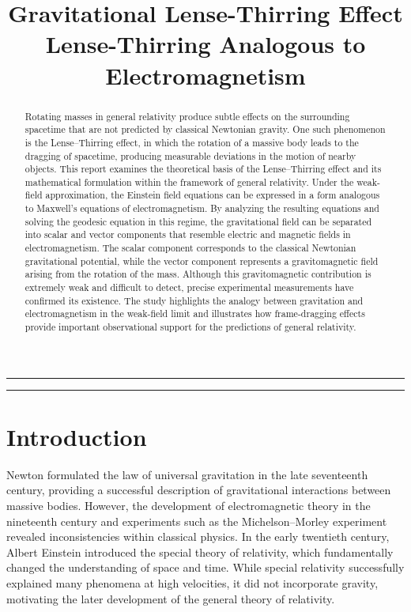 \documentclass[12pt, a4paper]{article}
\title{
  \vspace{-1.5cm}
  {\Large \textbf{Gravitational Lense-Thirring Effect}} \\[6pt]
  {\large Lense-Thirring Analogous to Electromagnetism}
}
\theoremstyle{plain}
\theoremstyle{definition}
\theoremstyle{remark}
\begin{document}

\maketitle
\thispagestyle{empty}

\begin{abstract}
  \noindent
  Rotating masses in general relativity produce subtle effects on the surrounding spacetime that are not predicted by classical Newtonian gravity. One such phenomenon is the Lense–Thirring effect, in which the rotation of a massive body leads to the dragging of spacetime, producing measurable deviations in the motion of nearby objects. This report examines the theoretical basis of the Lense–Thirring effect and its mathematical formulation within the framework of general relativity. Under the weak-field approximation, the Einstein field equations can be expressed in a form analogous to Maxwell’s equations of electromagnetism. By analyzing the resulting equations and solving the geodesic equation in this regime, the gravitational field can be separated into scalar and vector components that resemble electric and magnetic fields in electromagnetism. The scalar component corresponds to the classical Newtonian gravitational potential, while the vector component represents a gravitomagnetic field arising from the rotation of the mass. Although this gravitomagnetic contribution is extremely weak and difficult to detect, precise experimental measurements have confirmed its existence. The study highlights the analogy between gravitation and electromagnetism in the weak-field limit and illustrates how frame-dragging effects provide important observational support for the predictions of general relativity.
  



  \vspace{6pt}
  
\end{abstract}

\noindent\rule{\linewidth}{0.4pt}
\tableofcontents
\noindent\rule{\linewidth}{0.4pt}

\newpage

\section{Introduction}
\label{sec:introduction}
Newton formulated the law of universal gravitation in the late seventeenth century, providing a successful description of gravitational interactions between massive bodies. However, the development of electromagnetic theory in the nineteenth century and experiments such as the Michelson–Morley experiment revealed inconsistencies within classical physics. In the early twentieth century, Albert Einstein introduced the special theory of relativity, which fundamentally changed the understanding of space and time. While special relativity successfully explained many phenomena at high velocities, it did not incorporate gravity, motivating the later development of the general theory of relativity.
\end{document}
